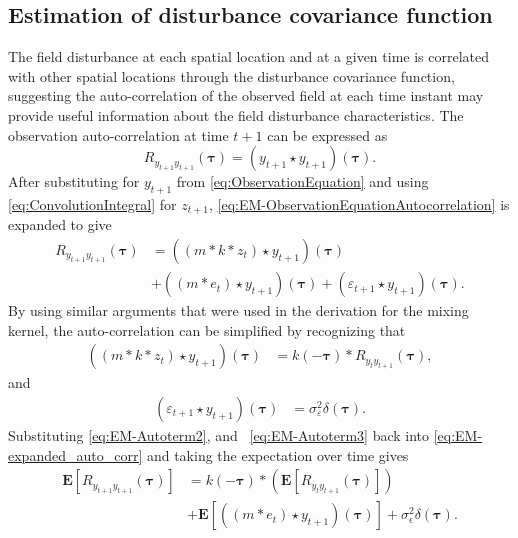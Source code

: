 \documentclass[10pt,twocolumn,twoside]{IEEEtran}
\begin{document}
\subsection{Estimation of disturbance covariance function}
The field disturbance at each spatial location and at a given time is correlated with other spatial locations through the disturbance covariance
function, suggesting the auto-correlation of the observed field at each time instant may provide useful information about the field disturbance characteristics.
The observation auto-correlation at time $t+1$ can be expressed as
\begin{equation}\label{eq:EM-ObservationEquationAutocorrelation}
	R_{y_{t+1}y_{t+1}}(\boldsymbol{\tau})=(y_{t+1} \star y_{t+1})(\boldsymbol\tau).
\end{equation}
 After substituting for $y_{t+1}$ from \eqref{eq:ObservationEquation} and using \eqref{eq:ConvolutionIntegral}   for $z_{t+1}$,  \eqref{eq:EM-ObservationEquationAutocorrelation} is expanded to give
\begin{align}\label{eq:EM-expanded_auto_corr}
	R_{y_{t+1}y_{t+1}}(\boldsymbol{\tau}) &= ((m\ast k\ast z_t)\star y_{t+1})(\boldsymbol{\tau}) \nonumber \\
	&+((m\ast e_{t})\star  y_{t+1})(\boldsymbol{\tau})+(\varepsilon_{t+1} \star y_{t+1})(\boldsymbol{\tau}).
\end{align}
By using similar arguments that were used in the derivation for the mixing kernel, the auto-correlation can be simplified by recognizing that
\begin{align}\label{eq:EM-Autoterm2}
	((m\ast k \ast z_t) \star y_{t+1})(\boldsymbol\tau) &= k(-\boldsymbol\tau) \ast R_{y_ty_{t+1}}(\boldsymbol\tau),
\end{align}
and
\begin{align}\label{eq:EM-Autoterm3}
 (\varepsilon_{t+1}\star y_{t+1})(\boldsymbol\tau)&=\sigma_{\varepsilon}^2\delta(\boldsymbol{\tau}).
\end{align}
Substituting \eqref{eq:EM-Autoterm2}, and ~\eqref{eq:EM-Autoterm3} back into \eqref{eq:EM-expanded_auto_corr} and taking the expectation over time  gives
\begin{align}\label{eq:EM-Auto&CrossNoisy}
	\mathbf{E}[R_{y_{t+1}y_{t+1}}(\boldsymbol{\tau})] &= k(-\boldsymbol\tau) \ast (\mathbf{E}\left[R_{y_ty_{t+1}}(\boldsymbol\tau)\right] ) \nonumber \\
	&+\mathbf{E}[((m\ast e_t)\star y_{t+1})(\boldsymbol\tau)] +\sigma_{\epsilon}^2\delta(\boldsymbol{\tau}).
\end{align}
\end{document}
